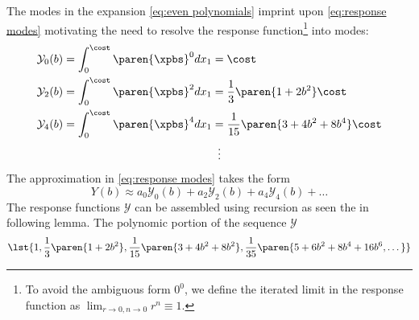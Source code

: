 \documentclass[final,leqno,onefignum,onetabnum]{siamltex1213}
\begin{document}
The modes in the expansion \eqref{eq:even polynomials} imprint upon \eqref{eq:response modes} motivating the need to resolve the response function\footnote{To avoid the ambiguous form $0^{0}$, we define the iterated limit in the response function as $\lim_{r\to0,n\to0}r^{n}\equiv 1$.} into modes:
%
\begin{equation}
  \begin{split}
%
    \mathcal{Y}_{0} (b) =
    \int_{0}^{\cost} \paren{ \xpbs }^{0} dx_{1} &=
      \cost \\
%
    \mathcal{Y}_{2} (b) =
    \int_{0}^{\cost} \paren{ \xpbs }^{2} dx_{1} &=
      \frac{1}{3} \paren{ 1 + 2b^{2} } \cost \\
%
    \mathcal{Y}_{4} (b) =
    \int_{0}^{\cost} \paren{ \xpbs }^{4} dx_{1} &=
      \frac{1}{15} \paren{ 3 + 4b^{2} + 8b^{4} } \cost \\
     & \phantom{a}\vdots
%
  \end{split}
  \label{eq:family Y}
\end{equation}
%
The approximation in \eqref{eq:response modes} takes the form
  \begin{equation}
    Y(b) \approx a_{0}\mathcal{Y}_{0} (b) + a_{2}\mathcal{Y}_{2} (b) + a_{4}\mathcal{Y}_{4} (b) + \dots
  \label{eq:mathcal Y}
  \end{equation}
The response functions $\mathcal{Y}$ can be assembled using recursion as seen the in following lemma.
%
The polynomic portion of the sequence $\mathcal{Y}$ 
\begin{equation}
  \lst{1, \frac{1}{3}\paren{ 1 + 2b^{2} }, \frac{1}{15}\paren{ 3 + 4b^{2} + 8b^{2} }, \frac{1}{35} \paren{ 5 + 6b^{2} + 8b^{4} + 16b^{6}, \dots } }
  \label{eq:bowls}
\end{equation}
\end{document}
